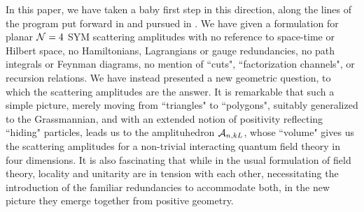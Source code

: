 \documentclass[12pt,nohyper,twosided]{JHEP3}
\begin{document}
In this paper, we have taken a baby first step in this direction,
along the lines of the  program put forward in \cite{N1,N2} and
pursued in \cite{N4,N5,N6}. We have given a formulation for planar
${\cal N} = 4$ SYM scattering amplitudes with no reference to
space-time or Hilbert space, no Hamiltonians, Lagrangians or gauge
redundancies, no path integrals or Feynman diagrams, no mention of
``cuts", ``factorization channels", or recursion relations. We have
instead presented  a new geometric question, to which the scattering
amplitudes are the answer. It is remarkable that such a  simple
picture, merely moving from ``triangles" to ``polygons", suitably
generalized to the Grassmannian, and with an extended notion of
positivity reflecting ``hiding" particles, leads us to the
amplituhedron ${\cal A}_{n,kL}$, whose ``volume" gives us the
scattering amplitudes for a non-trivial interacting quantum field
theory in four dimensions. It is also fascinating that while in  the
usual formulation of field theory, locality and unitarity are in
tension with each other, necessitating the introduction of the
familiar redundancies to accommodate both, in the new picture they
emerge together from positive geometry.
\end{document}
